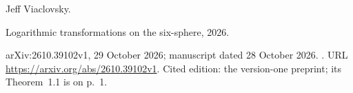 Jeff Viaclovsky.

\newblock Logarithmic transformations on the six-sphere, 2026{}.

\newblock arXiv:2610.39102v1, 29 October 2026; manuscript dated 28 October 2026.
\newblock {}.
\newblock URL \url{https://arxiv.org/abs/2610.39102v1}.
\newblock Cited edition: the version-one preprint; its Theorem~1.1 is on p.~1.


